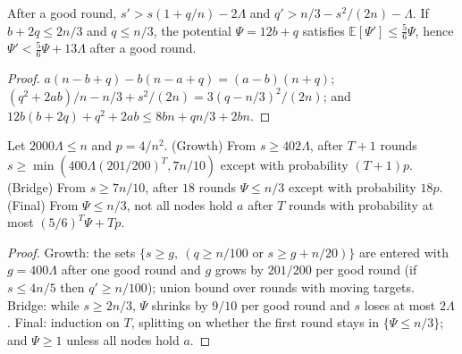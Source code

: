 \begin{lemma}\label{lem:goodround}
\leanok{}
After a good round, $s'>s(1+q/n)-2\Lambda$ and $q'>n/3-s^2/(2n)-\Lambda$. If $b+2q\le 2n/3$ and
$q\le n/3$, the potential $\Psi=12b+q$ satisfies $\mathbb E[\Psi']\le\frac56\Psi$, hence
$\Psi'<\frac56\Psi+13\Lambda$ after a good round.
\end{lemma}
\begin{proof}\leanok
$a(n-b+q)-b(n-a+q)=(a-b)(n+q)$; $(q^2+2ab)/n-n/3+s^2/(2n)=3(q-n/3)^2/(2n)$; and
$12b(b+2q)+q^2+2ab\le 8bn+qn/3+2bn$.
\end{proof}

\begin{theorem}[Phases]\label{thm:phases}
\leanok{}
Let $2000\Lambda\le n$ and $p=4/n^2$.
(Growth) From $s\ge 402\Lambda$, after $T+1$ rounds $s\ge\min(400\Lambda(201/200)^T,7n/10)$
except with probability $(T+1)p$.
(Bridge) From $s\ge 7n/10$, after $18$ rounds $\Psi\le n/3$ except with probability $18p$.
(Final) From $\Psi\le n/3$, not all nodes hold $a$ after $T$ rounds with probability at most
$(5/6)^T\Psi+Tp$.
\end{theorem}
\begin{proof}\leanok
Growth: the sets $\{s\ge g,\ (q\ge n/100\text{ or }s\ge g+n/20)\}$ are entered with $g=400\Lambda$
after one good round and $g$ grows by $201/200$ per good round (if $s\le 4n/5$ then $q'\ge n/100$);
union bound over rounds with moving targets. Bridge: while $s\ge 2n/3$, $\Psi$ shrinks by $9/10$
per good round and $s$ loses at most $2\Lambda$. Final: induction on $T$, splitting on whether
the first round stays in $\{\Psi\le n/3\}$; and $\Psi\ge 1$ unless all nodes hold $a$.
\end{proof}

